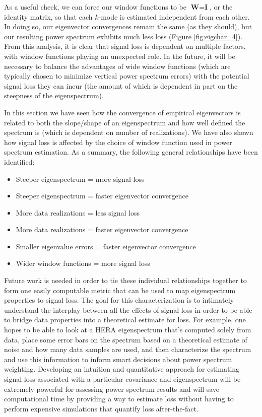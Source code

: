 As a useful check, we can force our window functions to be $\textbf{W} = \textbf{I}$, or the identity matrix, so that each $k$-mode is estimated independent from each other. In doing so, our eigenvector convergences remain the same (as they should), but our resulting power spectrum exhibits much less loss (Figure \ref{fig:eigchar_4}). From this analysis, it is clear that signal loss is dependent on multiple factors, with window functions playing an unexpected role. In the future, it will be necessary to balance the advantages of wide window functions (which are typically chosen to minimize vertical power spectrum errors) with the potential signal loss they can incur (the amount of which is dependent in part on the steepness of the eigenspectrum).

In this section we have seen how the convergence of empirical eigenvectors is related to both the slope/shape of an eigenspectrum and how well defined the spectrum is (which is dependent on number of realizations). We have also shown how signal loss is affected by the choice of window function used in power spectrum estimation. As a summary, the following general relationships have been identified:

\begin{itemize}
\item Steeper eigenspectrum = more signal loss
\item Steeper eigenspectrum = faster eigenvector convergence
\item More data realizations = less signal loss
\item More data realizations = faster eigenvector convergence
\item Smaller eigenvalue errors = faster eigenvector convergence
\item Wider window functions = more signal loss
\end{itemize}

Future work is needed in order to tie these individual relationships together to form one easily computable metric that can be used to map eigenspectrum properties to signal loss. The goal for this characterization is to intimately understand the interplay between all the effects of signal loss in order to be able to bridge data properties into a theoretical estimate for loss. For example, one hopes to be able to look at a HERA eigenspectrum that's computed solely from data, place some error bars on the spectrum based on a theoretical estimate of noise and how many data samples are used, and then characterize the spectrum and use this information to inform smart decisions about power spectrum weighting. Developing an intuition and quantitative approach for estimating signal loss associated with a particular covariance and eigenspectrum will be extremely powerful for assessing power spectrum results and will save computational time by providing a way to estimate loss without having to perform expensive simulations that quantify loss after-the-fact. 

